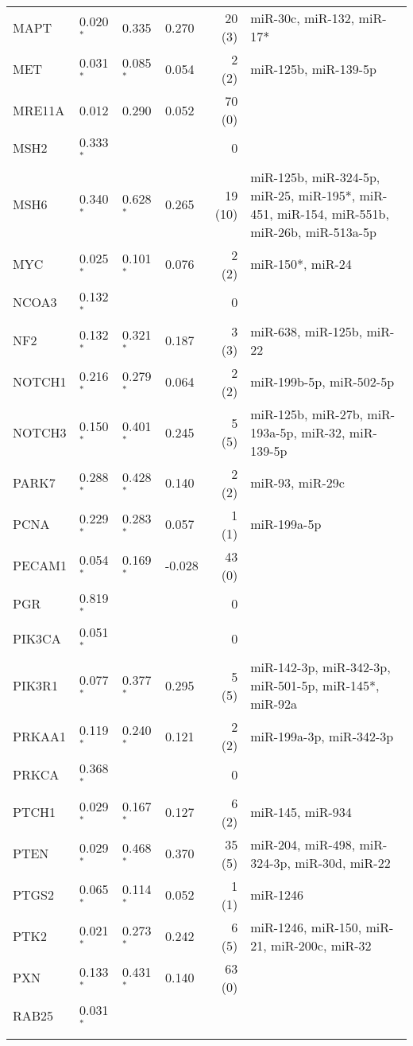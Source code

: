 {{\begin{longtable}{llllrp{7cm}}
MAPT&0.020$^{\ast}$&0.335&0.270&20 (3)&\raggedright{miR-30c, miR-132, miR-17*} \tabularnewline{}%
MET&0.031$^{\ast}$&0.085$^{\ast}$&0.054&2 (2)&\raggedright{miR-125b, miR-139-5p} \tabularnewline\rowcolor[rgb]{0.96,0.96,0.96}{}%
MRE11A&0.012&0.290&0.052&70 (0)&\raggedright{} \tabularnewline{}%
MSH2&0.333$^{\ast}$&&&0&\raggedright{} \tabularnewline\rowcolor[rgb]{0.96,0.96,0.96}{}%
MSH6&0.340$^{\ast}$&0.628$^{\ast}$&0.265&19 (10)&\raggedright{miR-125b, miR-324-5p, miR-25, miR-195*, miR-451, miR-154, miR-551b, miR-26b, miR-513a-5p} \tabularnewline{}%
MYC&0.025$^{\ast}$&0.101$^{\ast}$&0.076&2 (2)&\raggedright{miR-150*, miR-24} \tabularnewline\rowcolor[rgb]{0.96,0.96,0.96}{}%
NCOA3&0.132$^{\ast}$&&&0&\raggedright{} \tabularnewline{}%
NF2&0.132$^{\ast}$&0.321$^{\ast}$&0.187&3 (3)&\raggedright{miR-638, miR-125b, miR-22} \tabularnewline\rowcolor[rgb]{0.96,0.96,0.96}{}%
NOTCH1&0.216$^{\ast}$&0.279$^{\ast}$&0.064&2 (2)&\raggedright{miR-199b-5p, miR-502-5p} \tabularnewline{}%
NOTCH3&0.150$^{\ast}$&0.401$^{\ast}$&0.245&5 (5)&\raggedright{miR-125b, miR-27b, miR-193a-5p, miR-32, miR-139-5p} \tabularnewline\rowcolor[rgb]{0.96,0.96,0.96}{}%
PARK7&0.288$^{\ast}$&0.428$^{\ast}$&0.140&2 (2)&\raggedright{miR-93, miR-29c} \tabularnewline{}%
PCNA&0.229$^{\ast}$&0.283$^{\ast}$&0.057&1 (1)&\raggedright{miR-199a-5p} \tabularnewline\rowcolor[rgb]{0.96,0.96,0.96}{}%
PECAM1&0.054$^{\ast}$&0.169$^{\ast}$&-0.028&43 (0)&\raggedright{} \tabularnewline{}%
PGR&0.819$^{\ast}$&&&0&\raggedright{} \tabularnewline\rowcolor[rgb]{0.96,0.96,0.96}{}%
PIK3CA&0.051$^{\ast}$&&&0&\raggedright{} \tabularnewline{}%
PIK3R1&0.077$^{\ast}$&0.377$^{\ast}$&0.295&5 (5)&\raggedright{miR-142-3p, miR-342-3p, miR-501-5p, miR-145*, miR-92a} \tabularnewline\rowcolor[rgb]{0.96,0.96,0.96}{}%
PRKAA1&0.119$^{\ast}$&0.240$^{\ast}$&0.121&2 (2)&\raggedright{miR-199a-3p, miR-342-3p} \tabularnewline{}%
PRKCA&0.368$^{\ast}$&&&0&\raggedright{} \tabularnewline\rowcolor[rgb]{0.96,0.96,0.96}{}%
PTCH1&0.029$^{\ast}$&0.167$^{\ast}$&0.127&6 (2)&\raggedright{miR-145, miR-934} \tabularnewline{}%
PTEN&0.029$^{\ast}$&0.468$^{\ast}$&0.370&35 (5)&\raggedright{miR-204, miR-498, miR-324-3p, miR-30d, miR-22} \tabularnewline\rowcolor[rgb]{0.96,0.96,0.96}{}%
PTGS2&0.065$^{\ast}$&0.114$^{\ast}$&0.052&1 (1)&\raggedright{miR-1246} \tabularnewline{}%
PTK2&0.021$^{\ast}$&0.273$^{\ast}$&0.242&6 (5)&\raggedright{miR-1246, miR-150, miR-21, miR-200c, miR-32} \tabularnewline\rowcolor[rgb]{0.96,0.96,0.96}{}%
PXN&0.133$^{\ast}$&0.431$^{\ast}$&0.140&63 (0)&\raggedright{} \tabularnewline{}%
RAB25&0.031$^{\ast}$&&&&\raggedright{} \tabularnewline\rowcolor[rgb]{0.96,0.96,0.96}{}%

\end{longtable}}}

